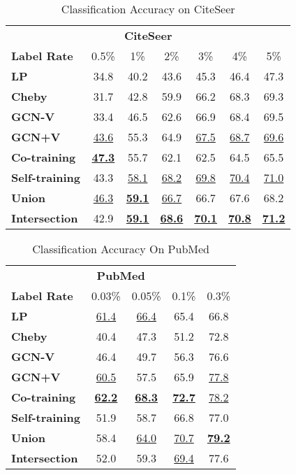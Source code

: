 \documentclass[letterpaper]{article} \usepackage{aaai18}  \usepackage{times}  \usepackage{helvet}  \usepackage{courier}  \usepackage{url}  \usepackage{graphicx}  \usepackage{algorithm}
\begin{document}
\begin{table}[t]
\small
\centering
\caption{Classification Accuracy on CiteSeer}\label{tab:citeseer}
\begin{tabular}{l cccccc}
    \multicolumn{7}{c}{\normalsize \textbf{CiteSeer}}\\
\textbf{Label Rate} & 0.5\% & 1\% & 2\% & 3\% & 4\% & 5\% \\
    \midrule
    \textbf{LP}             & 34.8 & 40.2 & 43.6 & 45.3 & 46.4 & 47.3 \\
\textbf{Cheby}          & 31.7 & 42.8 & 59.9 & 66.2 & 68.3 & 69.3 \\
    \textbf{GCN-V}          & 33.4 & 46.5 & 62.6 & 66.9 & 68.4 & 69.5 \\
    \textbf{GCN+V}          & \underline{43.6} & 55.3 & 64.9 & \underline{67.5} & \underline{68.7} & \underline{69.6} \\
    \midrule
    \textbf{Co-training}    & \underline{\textbf{47.3}} & 55.7 & 62.1 & 62.5 & 64.5 & 65.5 \\
    \textbf{Self-training}  & 43.3 & \underline{58.1} & \underline{68.2} & \underline{69.8} & \underline{70.4} & \underline{71.0} \\
    \textbf{Union}          & \underline{46.3} & \underline{\textbf{59.1}} & \underline{66.7} & 66.7 & 67.6 & 68.2 \\
    \textbf{Intersection}   & 42.9 & \underline{\textbf{59.1}} & \underline{\textbf{68.6}} & \underline{\textbf{70.1}} & \underline{\textbf{70.8}} & \underline{\textbf{71.2}} \\
\end{tabular}
\end{table}

\begin{table}[t]
\centering
\caption{Classification Accuracy On PubMed}\label{tab:pubmed}
\normalsize
\begin{tabular}{l cccc}
    \multicolumn{5}{c}{\normalsize \textbf{PubMed}} \\
\textbf{Label Rate} & 0.03\% & 0.05\% & 0.1\% & 0.3\% \\
    \midrule
    \textbf{LP}             & \underline{61.4} & \underline{66.4} & 65.4 & 66.8 \\
\textbf{Cheby}          & 40.4 & 47.3 & 51.2 & 72.8 \\
    \textbf{GCN-V}          & 46.4 & 49.7 & 56.3 & 76.6 \\
    \textbf{GCN+V}          & \underline{60.5} & 57.5 & 65.9 & \underline{77.8} \\
    \midrule
    \textbf{Co-training}    & \underline{\textbf{62.2}} & \underline{\textbf{68.3}} & \underline{\textbf{72.7}} & \underline{78.2} \\
    \textbf{Self-training}  & 51.9 & 58.7 & 66.8 & 77.0 \\
    \textbf{Union}          & 58.4 & \underline{64.0} & \underline{70.7} & \underline{\textbf{79.2}} \\
    \textbf{Intersection}   & 52.0 & 59.3 & \underline{69.4} & 77.6 \\
\end{tabular}
\end{table}
\end{document}
